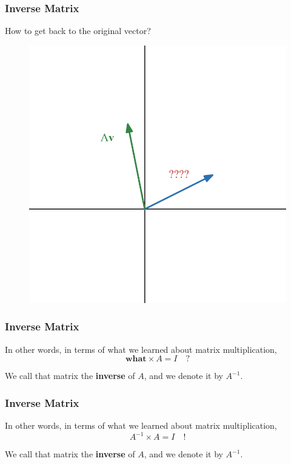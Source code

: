 \documentclass{beamer}
\begin{document}
\begin{frame}
  \frametitle{Inverse Matrix}

How to get back to the original vector?

\begin{figure}
    \centering
    \includegraphics[width=0.5\linewidth]{matrix product/desmos-graph (11).png}
\end{figure}    
\end{frame}


\begin{frame}
  \frametitle{Inverse Matrix}

In other words, in terms of what we learned about matrix multiplication, 
\[
\textbf{what} \times A = I \quad ?
\]

\pause

We call that matrix the \textbf{inverse} of $A$, and we denote it by $A^{-1}$.

\end{frame}


\begin{frame}
  \frametitle{Inverse Matrix}

In other words, in terms of what we learned about matrix multiplication, 
\[
A^{-1} \times A = I \quad !
\]



We call that matrix the \textbf{inverse} of $A$, and we denote it by $A^{-1}$.

\end{frame}
\end{document}
